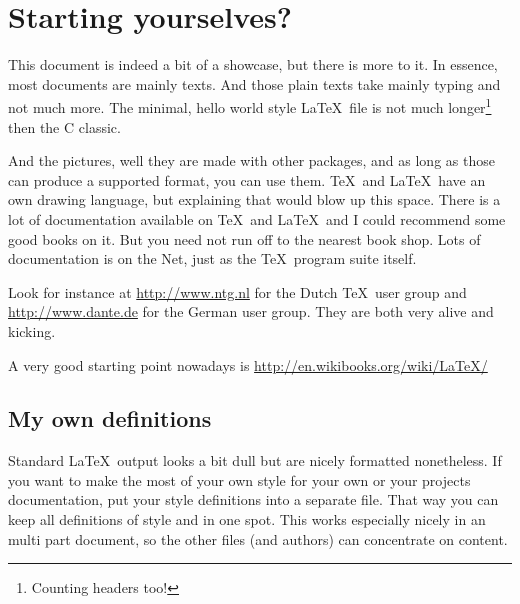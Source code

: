 \renewcommand\TheFile{ch07_poser.tex}
\chapter{Starting yourselves?} 


This document is indeed a bit of a showcase, but there is more to it.
In essence, most documents are mainly texts. 
And those plain texts take mainly typing and not much more.
The minimal, hello world style \LaTeX\ file is not much 
longer\footnote{Counting headers too!} then the C classic.


And the pictures, well they are made with other packages, and as long
as those can produce a supported format, you can use them. \TeX\ and
\LaTeX\ have an own drawing language, but explaining that would blow
up this space.
There is a lot of documentation available on \TeX\ and \LaTeX\ and I
could recommend some good books on it.
But you need not run off to the nearest book shop. Lots of
documentation is on the Net, just as the \TeX\ program suite itself. 

Look for instance at \url{http://www.ntg.nl} for the Dutch \TeX\ user group
and \url{http://www.dante.de} for the German user group. They are both very 
alive and kicking.

A very good starting point nowadays is \url{http://en.wikibooks.org/wiki/LaTeX/}

\section{My own definitions}
Standard \LaTeX\ output looks a bit dull but are nicely formatted nonetheless.
If you want to make the most of your own style for your own or your
projects documentation, put your style definitions into a separate
file. That way you can keep all definitions of style and  in one
spot. This works especially nicely in an multi part document, so
the other files (and authors) can concentrate on content.


